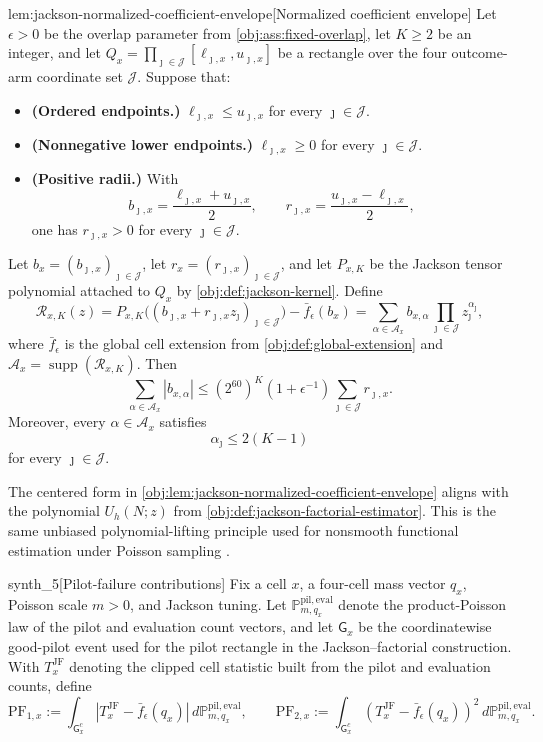 \begin{lemmav}{lem:jackson-normalized-coefficient-envelope}[Normalized coefficient envelope]
Let \(\epsilon>0\) be the overlap parameter from \cref{obj:ass:fixed-overlap}, let \(K\ge2\) be an integer, and let \(Q_x=\prod_{\jmath\in\mathcal J}[\ell_{\jmath,x},u_{\jmath,x}]\) be a rectangle over the four outcome-arm coordinate set \(\mathcal J\). Suppose that:
\begin{itemize}
\item \textbf{(Ordered endpoints.)} \(\ell_{\jmath,x}\le u_{\jmath,x}\) for every \(\jmath\in\mathcal J\).
\item \textbf{(Nonnegative lower endpoints.)} \(\ell_{\jmath,x}\ge0\) for every \(\jmath\in\mathcal J\).
\item \textbf{(Positive radii.)} With
\[
b_{\jmath,x}=\frac{\ell_{\jmath,x}+u_{\jmath,x}}{2},
\qquad
r_{\jmath,x}=\frac{u_{\jmath,x}-\ell_{\jmath,x}}{2},
\]
one has \(r_{\jmath,x}>0\) for every \(\jmath\in\mathcal J\).
\end{itemize}
Let \(b_x=(b_{\jmath,x})_{\jmath\in\mathcal J}\), let \(r_x=(r_{\jmath,x})_{\jmath\in\mathcal J}\), and let \(P_{x,K}\) be the Jackson tensor polynomial attached to \(Q_x\) by \cref{obj:def:jackson-kernel}. Define
\[
\mathcal R_{x,K}(z)
=
P_{x,K}\bigl((b_{\jmath,x}+r_{\jmath,x}z_\jmath)_{\jmath\in\mathcal J}\bigr)
-\bar f_\epsilon(b_x)
=
\sum_{\alpha\in\mathcal A_x} b_{x,\alpha}\prod_{\jmath\in\mathcal J} z_\jmath^{\alpha_\jmath},
\]
where \(\bar f_\epsilon\) is the global cell extension from \cref{obj:def:global-extension} and \(\mathcal A_x=\operatorname{supp}(\mathcal R_{x,K})\). Then
\[
\sum_{\alpha\in\mathcal A_x}|b_{x,\alpha}|
\le
(2^{60})^{K}(1+\epsilon^{-1})\sum_{\jmath\in\mathcal J}r_{\jmath,x}.
\]
Moreover, every \(\alpha\in\mathcal A_x\) satisfies
\[
\alpha_\jmath\le 2(K-1)
\]
for every \(\jmath\in\mathcal J\).
\end{lemmav}

The centered form in \cref{obj:lem:jackson-normalized-coefficient-envelope} aligns with the polynomial \(U_h(N;z)\) from \cref{obj:def:jackson-factorial-estimator}. This is the same unbiased polynomial-lifting principle used for nonsmooth functional estimation under Poisson sampling \citep{JiaoVenkatHanWeissman2015Functionals}.

\begin{definitionv}{synth_5}[Pilot-failure contributions]
Fix a cell \(x\), a four-cell mass vector \(q_x\), Poisson scale \(m>0\), and Jackson tuning. Let \(\mathbb P_{m,q_x}^{\mathrm{pil,eval}}\) denote the product-Poisson law of the pilot and evaluation count vectors, and let \(\mathsf G_x\) be the coordinatewise good-pilot event used for the pilot rectangle in the Jackson--factorial construction. With \(T_x^{\mathrm{JF}}\) denoting the clipped cell statistic built from the pilot and evaluation counts, define \[ \mathrm{PF}_{1,x}:=\int_{\mathsf G_x^c}\left|T_x^{\mathrm{JF}}-\bar f_\epsilon(q_x)\right|\,d\mathbb P_{m,q_x}^{\mathrm{pil,eval}}, \qquad \mathrm{PF}_{2,x}:=\int_{\mathsf G_x^c}\left(T_x^{\mathrm{JF}}-\bar f_\epsilon(q_x)\right)^2\,d\mathbb P_{m,q_x}^{\mathrm{pil,eval}}. \]
\end{definitionv}

